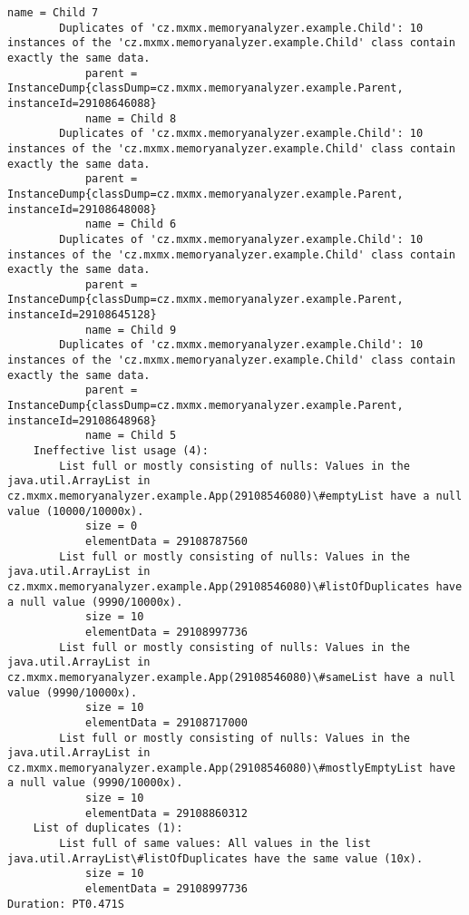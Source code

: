 \begin{minipage}{\linewidth}
\begin{lstlisting}[basicstyle=\tiny,columns=fullflexible,frame=single,breaklines=true,postbreak=\mbox{\textcolor{red}{$\hookrightarrow$}\space}]
            name = Child 7
        Duplicates of 'cz.mxmx.memoryanalyzer.example.Child': 10 instances of the 'cz.mxmx.memoryanalyzer.example.Child' class contain exactly the same data.
            parent = InstanceDump{classDump=cz.mxmx.memoryanalyzer.example.Parent, instanceId=29108646088}
            name = Child 8
        Duplicates of 'cz.mxmx.memoryanalyzer.example.Child': 10 instances of the 'cz.mxmx.memoryanalyzer.example.Child' class contain exactly the same data.
            parent = InstanceDump{classDump=cz.mxmx.memoryanalyzer.example.Parent, instanceId=29108648008}
            name = Child 6
        Duplicates of 'cz.mxmx.memoryanalyzer.example.Child': 10 instances of the 'cz.mxmx.memoryanalyzer.example.Child' class contain exactly the same data.
            parent = InstanceDump{classDump=cz.mxmx.memoryanalyzer.example.Parent, instanceId=29108645128}
            name = Child 9
        Duplicates of 'cz.mxmx.memoryanalyzer.example.Child': 10 instances of the 'cz.mxmx.memoryanalyzer.example.Child' class contain exactly the same data.
            parent = InstanceDump{classDump=cz.mxmx.memoryanalyzer.example.Parent, instanceId=29108648968}
            name = Child 5
    Ineffective list usage (4):
        List full or mostly consisting of nulls: Values in the java.util.ArrayList in cz.mxmx.memoryanalyzer.example.App(29108546080)\#emptyList have a null value (10000/10000x).
            size = 0
            elementData = 29108787560
        List full or mostly consisting of nulls: Values in the java.util.ArrayList in cz.mxmx.memoryanalyzer.example.App(29108546080)\#listOfDuplicates have a null value (9990/10000x).
            size = 10
            elementData = 29108997736
        List full or mostly consisting of nulls: Values in the java.util.ArrayList in cz.mxmx.memoryanalyzer.example.App(29108546080)\#sameList have a null value (9990/10000x).
            size = 10
            elementData = 29108717000
        List full or mostly consisting of nulls: Values in the java.util.ArrayList in cz.mxmx.memoryanalyzer.example.App(29108546080)\#mostlyEmptyList have a null value (9990/10000x).
            size = 10
            elementData = 29108860312
    List of duplicates (1):
        List full of same values: All values in the list java.util.ArrayList\#listOfDuplicates have the same value (10x).
            size = 10
            elementData = 29108997736
Duration: PT0.471S
\end{lstlisting}
\end{minipage}